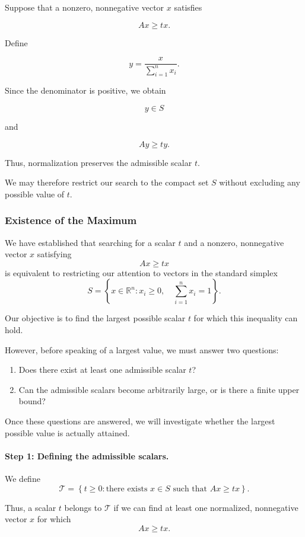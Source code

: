 \documentclass[11pt,a4paper]{article}
\theoremstyle{definition}
\theoremstyle{remark}
\begin{document}
Suppose that a nonzero,
nonnegative vector $x$ satisfies

\[
Ax\geq tx.
\]

Define

\[
y=
\frac{x}{\sum_{i=1}^{n}x_i}.
\]

Since the denominator is positive,
we obtain

\[
y\in S
\]

and

\[
Ay\geq ty.
\]

Thus, normalization preserves
the admissible scalar $t$.

We may therefore restrict our
search to the compact set $S$
without excluding any possible
value of $t$.


\subsubsection{Existence of the Maximum}

We have established that searching for a scalar
$t$ and a nonzero, nonnegative vector $x$
satisfying
\[
Ax\geq tx
\]
is equivalent to restricting our attention
to vectors in the standard simplex
\[
S=
\left\{
x\in\mathbb{R}^n:
x_i\geq0,\quad
\sum_{i=1}^{n}x_i=1
\right\}.
\]

Our objective is to find the largest possible
scalar $t$ for which this inequality can hold.

However, before speaking of a largest value,
we must answer two questions:

\begin{enumerate}
    \item Does there exist at least one
    admissible scalar $t$?

    \item Can the admissible scalars become
    arbitrarily large, or is there a finite
    upper bound?
\end{enumerate}

Once these questions are answered, we will
investigate whether the largest possible
value is actually attained.

\paragraph{Step 1: Defining the admissible scalars.}

We define
\[
\mathcal{T}
=
\left\{
t\geq0:
\text{there exists }x\in S
\text{ such that }Ax\geq tx
\right\}.
\]

Thus, a scalar $t$ belongs to $\mathcal{T}$
if we can find at least one normalized,
nonnegative vector $x$ for which
\[
Ax\geq tx.
\]
\end{document}
